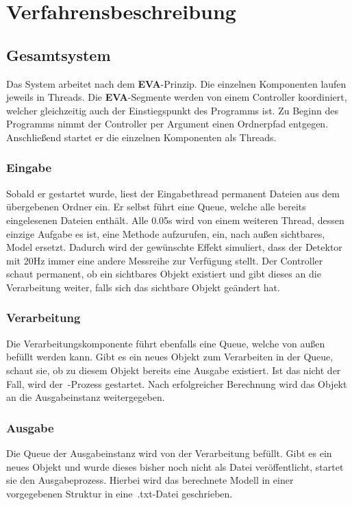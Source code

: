 \chapter{Verfahrensbeschreibung}\label{ch:verfahrensbeschreibung}


\section{Gesamtsystem}\label{sec:gesamtsystem}
Das System arbeitet nach dem \textbf{EVA}-Prinzip.
Die einzelnen Komponenten laufen jeweils in Threads.
Die \textbf{EVA}-Segmente werden von einem Controller koordiniert, welcher gleichzeitig auch der Einstiegspunkt des Programms ist.
Zu Beginn des Programms nimmt der Controller per Argument einen Ordnerpfad entgegen.
Anschließend startet er die einzelnen Komponenten als Threads.

\subsection{Eingabe}\label{subsec:eingabe}
Sobald er gestartet wurde, liest der Eingabethread permanent Dateien aus dem übergebenen Ordner ein.
Er selbst führt eine Queue, welche alle bereits eingelesenen Dateien enthält.
Alle 0.05s wird von einem weiteren Thread, dessen einzige Aufgabe es ist, eine Methode aufzurufen, ein, nach außen sichtbares, Model ersetzt.
Dadurch wird der gewünschte Effekt simuliert, dass der Detektor mit 20Hz immer eine andere Messreihe zur Verfügung stellt.
Der Controller schaut permanent, ob ein sichtbares Objekt existiert und gibt dieses an die Verarbeitung weiter, falls sich das sichtbare Objekt geändert hat.

\subsection{Verarbeitung}\label{subsec:verarbeitung}
Die Verarbeitungskomponente führt ebenfalls eine Queue, welche von außen befüllt werden kann.
Gibt es ein neues Objekt zum Verarbeiten in der Queue, schaut sie, ob zu diesem Objekt bereits eine Ausgabe existiert.
Ist das nicht der Fall, wird der~-Prozess gestartet.
Nach erfolgreicher Berechnung wird das Objekt an die Ausgabeinstanz weitergegeben.

\subsection{Ausgabe}\label{subsec:ausgabe}
Die Queue der Ausgabeinstanz wird von der Verarbeitung befüllt.
Gibt es ein neues Objekt und wurde dieses bisher noch nicht als Datei veröffentlicht, startet sie den Ausgabeprozess.
Hierbei wird das berechnete Modell in einer vorgegebenen Struktur in eine~.txt-Datei geschrieben.


